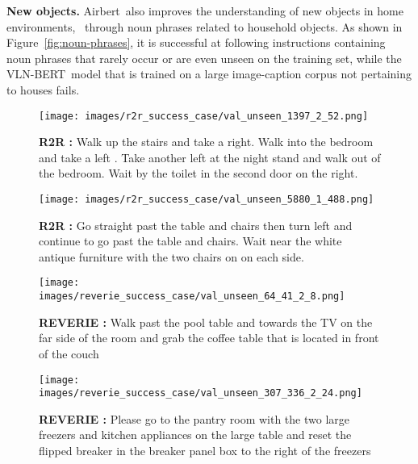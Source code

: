 \RequirePackage[dvipsnames,table]{xcolor} \documentclass[10pt,twocolumn,letterpaper]{article}
\newcommand{\p}[1]{\vspace{1mm}\noindent\textbf{#1}}
\newcommand{\vlnbert}{VLN-BERT}
\newcommand{\airbert}{Airbert}
\newcommand{\success}{{\color{ForestGreen}{\ding{52}}}}
\begin{document}
\p{New objects.}
\airbert~also improves the understanding of new objects in home environments, \eg~through noun phrases related to household objects.
As shown in Figure~\ref{fig:noun-phrases}, it is successful at following instructions containing noun phrases that rarely occur or are even unseen on the training set, while the \vlnbert~model that is trained on a large image-caption corpus not pertaining to houses fails.


\begin{figure*}[t]
    \centering
    \begin{subfigure}[b]{0.47\textwidth}
    \centering
    \texttt{[image: images/r2r\_success\_case/val\_unseen\_1397\_2\_52.png]} 
    \hspace*{-3cm}\caption{\textbf{R2R \success{}:} Walk up the stairs and take a right. Walk into the bedroom and take a left . Take another left at the {\color{red} night stand} and walk out of the bedroom. Wait by the toilet in the second door on the right.}\label{fig:r2r-word}\end{subfigure}
    \hfill
    \begin{subfigure}[b]{0.47\textwidth}
    \centering
    \texttt{[image: images/r2r\_success\_case/val\_unseen\_5880\_1\_488.png]} 
    \caption{\textbf{R2R \success{}:} Go straight past the table and chairs then turn left and continue to go past the table and chairs. Wait near the white {\color{red} antique furniture} with the two chairs on on each side.}\label{fig:r2r-word4}\end{subfigure}
    
    \begin{subfigure}[b]{0.47\textwidth}\centering
    \texttt{[image: images/reverie\_success\_case/val\_unseen\_64\_41\_2\_8.png]} 
    \caption{\textbf{REVERIE \success{}:} Walk past the  {\color{red} pool table} and towards the TV on the far side of the room and grab the coffee table that is located in front of the couch}\end{subfigure}  \hfill
    \begin{subfigure}[b]{0.47\textwidth}\centering
    \texttt{[image: images/reverie\_success\_case/val\_unseen\_307\_336\_2\_24.png]} 
    \caption{\textbf{REVERIE \success{}:} Please go to the pantry room with the two large freezers and kitchen appliances on the large table and reset the flipped breaker in the breaker panel box to the right of the  {\color{red} freezers}}\end{subfigure}\caption{The \airbert~model outperforms \vlnbert~to recognize rare or even unseen objects in training set. (a) Rare object ``\emph{night stand}''; (b) unseen object ``\emph{antique furniture}''; (c) rare object ``\emph{pool table}''; and (d) unseen object ``\emph{freezer}''.}
    \label{fig:noun-phrases}
\end{figure*}
\end{document}

